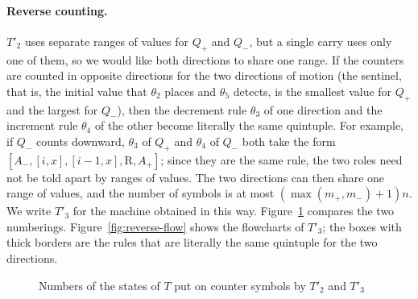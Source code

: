 \documentclass{article}
\theoremstyle{definition}
\theoremstyle{remark}
\newcommand{\rmR}{\mathrm{R}}
\begin{document}
\paragraph{Reverse counting.}
$T'_2$ uses separate ranges of values for $Q_+$ and $Q_-$, but a single carry uses only one of them, so we would like both directions to share one range.
If the counters are counted in opposite directions for the two directions of motion (the sentinel, that is, the initial value that $\theta_2$ places and $\theta_5$ detects, is the smallest value for $Q_+$ and the largest for $Q_-$), then the decrement rule $\theta_3$ of one direction and the increment rule $\theta_4$ of the other become literally the same quintuple. For example, if $Q_-$ counts downward, $\theta_3$ of $Q_+$ and $\theta_4$ of $Q_-$ both take the form $[A_-,[i,x],[i-1,x],\rmR,A_+]$; since they are the same rule, the two roles need not be told apart by ranges of values.
The two directions can then share one range of values, and the number of symbols is at most $(\max(m_+,m_-)+1)n$. We write $T'_3$ for the machine obtained in this way.
Figure~\ref{fig:ranges} compares the two numberings.
Figure~\ref{fig:reverse-flow} shows the flowcharts of $T'_3$; the boxes with thick borders are the rules that are literally the same quintuple for the two directions.
\begin{figure}[tb]
\centering
{}
\caption{Numbers of the states of $T$ put on counter symbols by $T'_2$ and $T'_3$}
\label{fig:ranges}
\end{figure}
\end{document}
